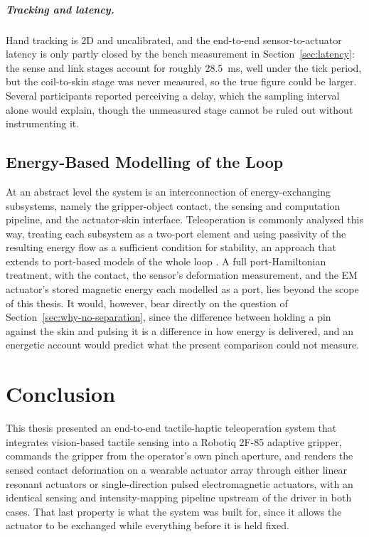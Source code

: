 \documentclass[12pt, a4paper, twoside, openright]{report}
\begin{document}
\paragraph{Tracking and latency.} Hand tracking is 2D and uncalibrated, and the
end-to-end sensor-to-actuator latency is only partly closed by the bench
measurement in Section~\ref{sec:latency}: the sense and link stages account for
roughly \SI{28.5}{\milli\second}, well under the tick period, but the
coil-to-skin stage was never measured, so the true figure could be larger.
Several participants reported perceiving a delay, which the sampling interval
alone would explain, though the unmeasured stage cannot be ruled out without
instrumenting it.

\section{Energy-Based Modelling of the Loop}
\label{sec:phs}

At an abstract level the system is an interconnection of energy-exchanging
subsystems, namely the gripper-object contact, the sensing and computation
pipeline, and the actuator-skin interface. Teleoperation is commonly analysed
this way, treating each subsystem as a two-port element and using passivity of
the resulting energy flow as a sufficient condition for stability, an approach
that extends to port-based models of the whole loop \cite{niemeyer2016}. A full
port-Hamiltonian treatment, with the contact, the sensor's deformation
measurement, and the EM actuator's stored magnetic energy each modelled as a
port, lies beyond the scope of this thesis. It would, however, bear directly on
the question of Section~\ref{sec:why-no-separation}, since the difference
between holding a pin against the skin and pulsing it is a difference in how
energy is delivered, and an energetic account would predict what the present
comparison could not measure.

\chapter{Conclusion}
\label{ch:conclusion}

This thesis presented an end-to-end tactile-haptic teleoperation system that
integrates vision-based tactile sensing into a Robotiq 2F-85 adaptive gripper,
commands the gripper from the operator's own pinch aperture, and renders the
sensed contact deformation on a wearable actuator array through either linear
resonant actuators or single-direction pulsed electromagnetic actuators, with
an identical sensing and intensity-mapping pipeline upstream of the driver in
both cases.
That last property is what the system was built for, since it allows the
actuator to be exchanged while everything before it is held fixed.
\end{document}
